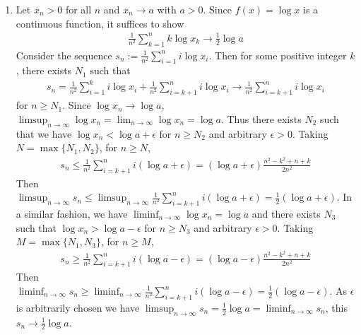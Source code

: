 \documentclass[a4paper,12pt]{article}
\theoremstyle{definition}
\begin{document}
\begin{enumerate}
\item Let $x_n >0$ for all $n$ and $x_n \to a$ with $a >0$. Since $f(x) = \log x$ is a continuous function, it suffices to show
\begin{align*}
\frac{1}{n^2}\sum_{k=1}^{n}k\log x_k \to \frac{1}{2}\log a
\end{align*}
Consider the sequence $s_n:=\frac{1}{n^2}\sum_{i=1}^{n}i\log x_i$. Then for some positive integer $k$, there exists $N_1$ such that 
\begin{align*}
s_n = \frac{1}{n^2}\sum_{i=1}^{k}i\log x_i+\frac{1}{n^2}\sum_{i=k+1}^{n}i\log x_i \to \frac{1}{n^2}\sum_{i=k+1}^{n}i\log x_i 
\end{align*}
for $n \geq N_1$. Since $\log x_n \to \log a$, $\limsup_{n\to \infty} \log x_n = \lim_{n\to \infty} \log x_n = \log a$. Thus there exists $N_2$ such that we have $\log x_n < \log a + \epsilon$ for $n \geq N_2$ and arbitrary $\epsilon >0$. Taking $N = \max\{N_1, N_2\}$, for $n \geq N$,
\begin{align*}
s_n \leq \frac{1}{n^2}\sum_{i=k+1}^{n}i(\log a + \epsilon) = (\log a + \epsilon)\frac{n^2-k^2+n+k}{2n^2}
\end{align*}
Then $\limsup_{n\to\infty}s_n \leq \limsup_{n\to\infty}\frac{1}{n^2}\sum_{i=k+1}^{n}i(\log a + \epsilon) = \frac{1}{2}(\log a + \epsilon)$. In a similar fashion, we have $\liminf_{n\to\infty}\log x_n = \log a$ and there exists $N_3$ such that $\log x_n > \log a - \epsilon$ for $n \geq N_3$ and arbitrary $\epsilon >0$. Taking $M =\max\{N_1,N_3\}$, for $n \geq M$,
\begin{align*}
s_n \geq \frac{1}{n^2}\sum_{i=k+1}^{n}i(\log a - \epsilon) = (\log a - \epsilon)\frac{n^2-k^2+n+k}{2n^2}
\end{align*}
Then $\liminf_{n\to\infty} s_n \geq \liminf_{n\to\infty}\frac{1}{n^2}\sum_{i=k+1}^{n}i(\log a - \epsilon) = \frac{1}{2}(\log a -\epsilon)$. As $\epsilon$ is arbitrarily chosen we have $\limsup_{n\to\infty} s_n=\frac{1}{2}\log a = \liminf_{n\to\infty}s_n$, this $s_n \to \frac{1}{2}\log a$.



\end{enumerate}
\end{document}
